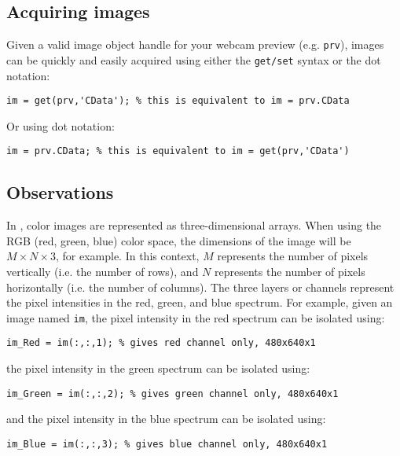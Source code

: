 \documentclass{tufte-handout}
\begin{document}
\subsection{Acquiring images}
Given a valid image object handle for your webcam preview (e.g. \lstinline{prv}), images can be quickly and easily acquired using either the \lstinline{get/set} syntax or the dot notation:
\begin{lstlisting}[style=usnaMatlab]
im = get(prv,'CData'); % this is equivalent to im = prv.CData
\end{lstlisting}
Or using dot notation:
\begin{lstlisting}[style=usnaMatlab]
im = prv.CData; % this is equivalent to im = get(prv,'CData')
\end{lstlisting}


\subsection{Observations}
In \Matlab, color images are represented as three-dimensional arrays. When using the RGB (red, green, blue) color space, the dimensions of the image will be $M\times N\times 3$, for example. In this context, $M$ represents the number of pixels vertically (i.e. the number of rows), and $N$ represents the number of pixels horizontally (i.e. the number of columns). The three layers or channels represent the pixel intensities in the red, green, and blue spectrum. For example, given an image named \lstinline{im}, the pixel intensity in the red spectrum can be isolated using:
\begin{lstlisting}[style=usnaMatlab]
im_Red = im(:,:,1); % gives red channel only, 480x640x1
\end{lstlisting}
the pixel intensity in the green spectrum can be isolated using:
\begin{lstlisting}[style=usnaMatlab]
im_Green = im(:,:,2); % gives green channel only, 480x640x1
\end{lstlisting}
and the pixel intensity in the blue spectrum can be isolated using:
\begin{lstlisting}[style=usnaMatlab]
im_Blue = im(:,:,3); % gives blue channel only, 480x640x1
\end{lstlisting}
\end{document}
